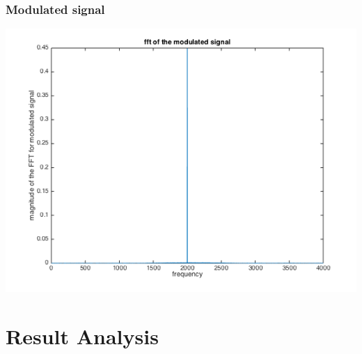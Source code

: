 \documentclass[11pt]{scrartcl}
\begin{document}
\subsubsection{Modulated signal}
\begin{minipage}[t]{\linewidth}
{
\includegraphics[scale = 0.6]{modulated_signal_fft.png}
}
\end{minipage}
\medskip

\section{Result Analysis}
\end{document}
